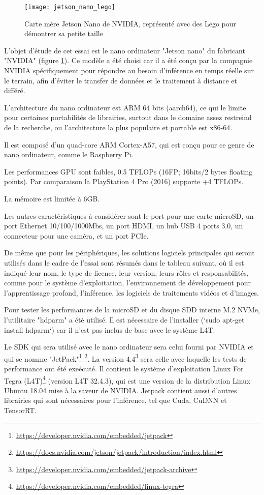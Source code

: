 ﻿
\begin{figure}[H]
    \centering
    \texttt{[image: jetson\_nano\_lego]}
    \caption[Carte mère Jetson Nano de NVIDIA]{Carte mère Jetson Nano de NVIDIA, représenté avec des Lego pour démontrer sa petite taille}
    \label{fig:jetson_nano_lego}
\end{figure}
\par L'objet d'étude de cet essai est le nano ordinateur "Jetson nano" du fabricant "NVIDIA" (figure \ref{fig:jetson_nano_lego}). Ce modèle a été choisi car il a été conçu par la compagnie NVIDIA spécifiquement pour répondre au besoin d'inférence en temps réelle sur le terrain, afin d'éviter le transfer de données et le traitement à distance et différé. 
\par L'architecture du nano ordinateur est ARM 64 bits (aarch64), ce qui le limite pour certaines portabilités de librairies, surtout dans le domaine assez restreind de la recherche, ou l'architecture la plus populaire et portable est x86-64. 
\par Il est composé d'un quad-core ARM Cortex-A57, qui est conçu pour ce genre de nano ordinateur, comme le Raspberry Pi.
\par Les performances GPU sont faibles, 0.5 TFLOPs (16FP; 16bits/2 bytes floating points). Par comparaison la PlayStation 4 Pro (2016) supporte +4 TFLOPs. 
\par La mémoire est limitée à 6GB. 
\par Les autres caractéristiques à considérer sont le port pour une carte microSD, un port Ethernet 10/100/1000Mbs, un port HDMI, un hub USB 4 ports 3.0, un connecteur pour une caméra, et un port PCIe.
\par De même que pour les périphériques, les solutions logiciels principales qui seront utilisés dans le cadre de l'essai sont résumés dans le tableau suivant, où il est indiqué leur nom, le type de licence, leur version, leurs rôles et responsabilités, comme pour le système d'exploitation, l'environnement de développement pour l'apprentissage profond, l'inférence, les logiciels de traitements vidéos et d'images. 
\par Pour tester les performances de la microSD et du disque SDD interne M.2 NVMe, l'utilitaire "hdparm" a été utilisé. Il est nécessaire de l'installer (`sudo apt-get install hdparm`) car il n'est pas inclus de base avec le système L4T.
\par Le SDK qui sera utilisé avec le nano ordinateur sera celui fourni par NVIDIA et qui se nomme "JetPack"\footnote{\url{https://developer.nvidia.com/embedded/jetpack}} \footnote{\url{https://docs.nvidia.com/jetson/jetpack/introduction/index.html}}. La version 4.4\footnote{\url{https://developer.nvidia.com/embedded/jetpack-archive}} sera celle avec laquelle les tests de performance ont été exeécuté. Il contient le système d'exploitation Linux For Tegra (L4T)\footnote{\url{https://developer.nvidia.com/embedded/linux-tegra}} (version L4T 32.4.3), qui est une version de la distribution Linux Ubuntu 18.04 mise à la saveur de NVIDIA. Jetpack contient aussi d'autres librairies qui sont nécessaires pour l'inférence, tel que Cuda, CuDNN et TensorRT.
